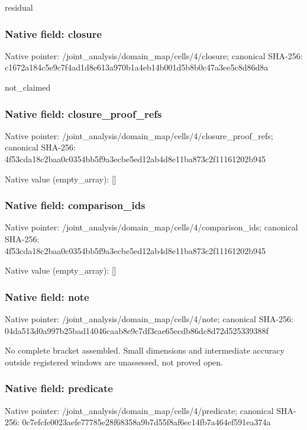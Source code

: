 \documentclass[10pt,a4paper]{article}
\begin{document}
\begingroup\raggedright\sloppy residual\par\endgroup

\subsubsection{Native field: closure}
Native pointer: /joint\_\allowbreak{}analysis/domain\_\allowbreak{}map/cells/4/closure; canonical SHA-256: c1672a184c5e9c7f4ad1d8e613a970b1a4eb14b001d5b8b0c47a3ee5c8d86d8a

\begingroup\raggedright\sloppy not\_\allowbreak{}claimed\par\endgroup

\subsubsection{Native field: closure\_\allowbreak{}proof\_\allowbreak{}refs}
Native pointer: /joint\_\allowbreak{}analysis/domain\_\allowbreak{}map/cells/4/closure\_\allowbreak{}proof\_\allowbreak{}refs; canonical SHA-256: 4f53cda18c2baa0c0354bb5f9a3ecbe5ed12ab4d8e11ba873c2f11161202b945

Native value (empty\_\allowbreak{}array): []

\subsubsection{Native field: comparison\_\allowbreak{}ids}
Native pointer: /joint\_\allowbreak{}analysis/domain\_\allowbreak{}map/cells/4/comparison\_\allowbreak{}ids; canonical SHA-256: 4f53cda18c2baa0c0354bb5f9a3ecbe5ed12ab4d8e11ba873c2f11161202b945

Native value (empty\_\allowbreak{}array): []

\subsubsection{Native field: note}
Native pointer: /joint\_\allowbreak{}analysis/domain\_\allowbreak{}map/cells/4/note; canonical SHA-256: 04da513d0a997b25bad14046caab8e9c7df3cae65ecdb86dc8d72d525339388f

\begingroup\raggedright\sloppy No complete bracket assembled. Small dimensions and intermediate accuracy outside registered windows are unassessed,\allowbreak{} not proved open.\par\endgroup

\subsubsection{Native field: predicate}
Native pointer: /joint\_\allowbreak{}analysis/domain\_\allowbreak{}map/cells/4/predicate; canonical SHA-256: 0c7efcfe0023aefe77785e28f68358a9b7d55f8af6ec14fb7a464ef591ea374a
\end{document}
